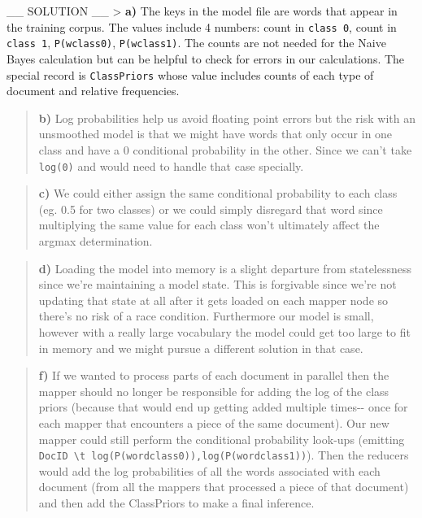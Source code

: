 \documentclass[11pt]{article}
\begin{document}
\_\_ SOLUTION \_\_ \textgreater{} \textbf{a)} The keys in the model file
are words that appear in the training corpus. The values include 4
numbers: count in \texttt{class\ 0}, count in \texttt{class\ 1},
\texttt{P(w\textbar{}class0)}, \texttt{P(w\textbar{}class1)}. The counts
are not needed for the Naive Bayes calculation but can be helpful to
check for errors in our calculations. The special record is
\texttt{ClassPriors} whose value includes counts of each type of
document and relative frequencies.

\begin{quote}
\textbf{b)} Log probabilities help us avoid floating point errors but
the risk with an unsmoothed model is that we might have words that only
occur in one class and have a 0 conditional probability in the other.
Since we can't take \texttt{log(0)} and would need to handle that case
specially.
\end{quote}

\begin{quote}
\textbf{c)} We could either assign the same conditional probability to
each class (eg. 0.5 for two classes) or we could simply disregard that
word since multiplying the same value for each class won't ultimately
affect the argmax determination.
\end{quote}

\begin{quote}
\textbf{d)} Loading the model into memory is a slight departure from
statelessness since we're maintaining a model state. This is forgivable
since we're not updating that state at all after it gets loaded on each
mapper node so there's no risk of a race condition. Furthermore our
model is small, however with a really large vocabulary the model could
get too large to fit in memory and we might pursue a different solution
in that case.
\end{quote}

\begin{quote}
\textbf{f)} If we wanted to process parts of each document in parallel
then the mapper should no longer be responsible for adding the log of
the class priors (because that would end up getting added multiple
times-\/- once for each mapper that encounters a piece of the same
document). Our new mapper could still perform the conditional
probability look-ups (emitting
\texttt{DocID\ \textbackslash{}t\ log(P(word\textbar{}class0)),log(P(word\textbar{}class1))}).
Then the reducers would add the log probabilities of all the words
associated with each document (from all the mappers that processed a
piece of that document) and then add the ClassPriors to make a final
inference.
\end{quote}
\end{document}
